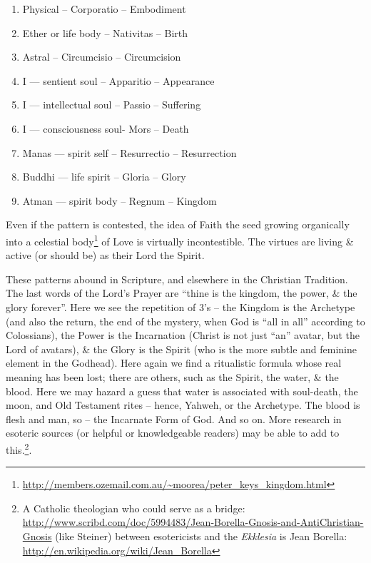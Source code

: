 \begin{enumerate}
\item Physical -- Corporatio -- Embodiment

\item Ether or life body -- Nativitas -- Birth

\item  Astral -- Circumcisio -- Circumcision

\item I --- sentient soul -- Apparitio -- Appearance

\item I --- intellectual soul -- Passio -- Suffering

\item I --- consciousness soul- Mors -- Death

\item Manas --- spirit self -- Resurrectio -- Resurrection

\item Buddhi --- life spirit -- Gloria -- Glory

\item Atman --- spirit body -- Regnum -- Kingdom
\end{enumerate}


Even if the pattern is contested, the idea of Faith the seed growing organically into a celestial body\footnote{\url{http://members.ozemail.com.au/~moorea/peter\_keys\_kingdom.html}} of Love is virtually incontestible. The virtues are living \& active (or should be) as their Lord the Spirit.

These patterns abound in Scripture, and elsewhere in the Christian Tradition. The last words of the Lord's Prayer are ``thine is the kingdom, the power, \& the glory forever''. Here we see the repetition of 3's -- the Kingdom is the Archetype (and also the return, the end of the mystery, when God is ``all in all'' according to Colossians), the Power is the Incarnation (Christ is not just ``an'' avatar, but the Lord of avatars), \& the Glory is the Spirit (who is the more subtle and feminine element in the Godhead). Here again we find a ritualistic formula whose real meaning has been lost; there are others, such as the Spirit, the water, \& the blood. Here we may hazard a guess that water is associated with soul-death, the moon, and Old Testament rites -- hence, Yahweh, or the Archetype. The blood is flesh and man, so -- the Incarnate Form of God. And so on. More research in esoteric sources (or helpful or knowledgeable readers) may be able to add to this.\footnote{A Catholic theologian who could serve as a bridge: \url{http://www.scribd.com/doc/5994483/Jean-Borella-Gnosis-and-AntiChristian-Gnosis} (like Steiner) between esotericists and the \emph{Ekklesia} is Jean Borella: \url{http://en.wikipedia.org/wiki/Jean\_Borella}}.



